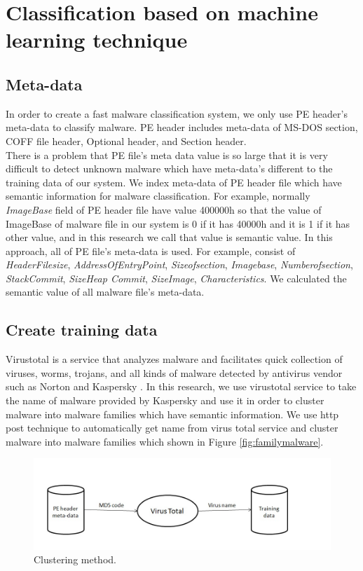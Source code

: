 \section{Classification based on machine learning technique} 
\subsection{Meta-data}
In order to create a fast malware classification system, we only use PE header's meta-data to classify malware. PE header includes meta-data of MS-DOS section, COFF file header, Optional header, and Section header.\\
There is a problem that PE file's meta data value is so large that it is very difficult to detect unknown malware which have meta-data's different to the training data of our system. We index meta-data of PE header file which have semantic information for malware classification. For example, normally \emph{ImageBase} field of PE header file have value 400000h \cite{goppit} so that the value of ImageBase of malware file in our system is 0 if it has 40000h and it is 1 if it has other value, and in this research we call that value is semantic value. In this approach, all of PE file's meta-data is used. For example, consist of \emph{HeaderFilesize}, \emph{AddressOfEntryPoint}, \emph{Sizeofsection}, \emph{Imagebase}, \emph{Numberofsection}, \emph{StackCommit}, \emph{SizeHeap Commit}, \emph{SizeImage}, \emph{Characteristics}. We calculated the semantic value of all malware file's meta-data.
\subsection{Create training data}
Virustotal is a service that analyzes malware and facilitates quick collection of viruses, worms, trojans, and all kinds of malware detected by antivirus vendor such as Norton and Kaspersky \cite{virustotal}. In this research, we use virustotal service to take the name of malware provided by Kaspersky and use it in order to cluster malware into malware families which have semantic information. 
We use http post technique to automatically get name from virus total service and cluster malware into malware families which shown in Figure \ref{fig:familymalware}.
\begin{figure}[h!]
\centering
\includegraphics[width=1\textwidth]{graph/clustering.jpg}
\caption{Clustering method.}
\label{fig:clustering}
\end{figure}
\newline

